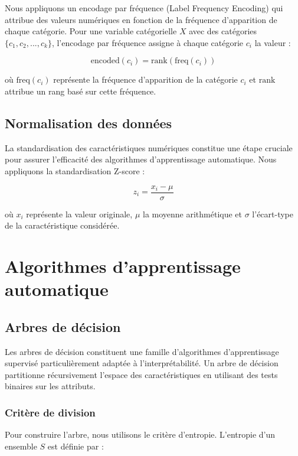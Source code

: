 Nous appliquons un encodage par fréquence (Label Frequency Encoding) qui attribue des valeurs numériques en fonction de la fréquence d'apparition de chaque catégorie. Pour une variable catégorielle $X$ avec des catégories $\{c_1, c_2, ..., c_k\}$, l'encodage par fréquence assigne à chaque catégorie $c_i$ la valeur :

\begin{equation}
    \text{encoded}(c_i) = \text{rank}(\text{freq}(c_i))
\end{equation}

où $\text{freq}(c_i)$ représente la fréquence d'apparition de la catégorie $c_i$ et $\text{rank}$ attribue un rang basé sur cette fréquence.

\subsection{Normalisation des données}

La standardisation des caractéristiques numériques constitue une étape cruciale pour assurer l'efficacité des algorithmes d'apprentissage automatique. Nous appliquons la standardisation Z-score :

\begin{equation}
    z_i = \frac{x_i - \mu}{\sigma}
\end{equation}

où $x_i$ représente la valeur originale, $\mu$ la moyenne arithmétique et $\sigma$ l'écart-type de la caractéristique considérée.

\section{Algorithmes d'apprentissage automatique}

\subsection{Arbres de décision}

Les arbres de décision constituent une famille d'algorithmes d'apprentissage supervisé particulièrement adaptée à l'interprétabilité. Un arbre de décision partitionne récursivement l'espace des caractéristiques en utilisant des tests binaires sur les attributs.

\subsubsection{Critère de division}
Pour construire l'arbre, nous utilisons le critère d'entropie. L'entropie d'un ensemble $S$ est définie par :

